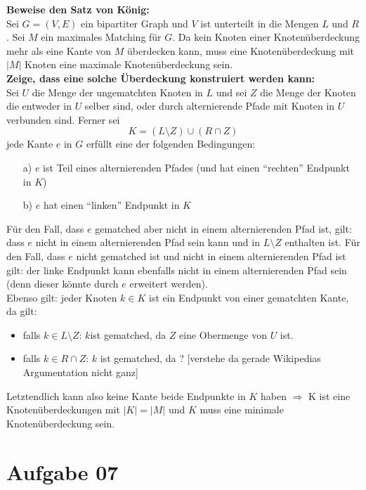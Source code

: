\documentclass[10pt,a4paper]{article}
\begin{document}
    \textbf{Beweise den Satz von König:} \\
    Sei $G = (V,E)$ ein bipartiter Graph und $V$ ist unterteilt in
    die Mengen $L$ und $R$. Sei $M$ ein maximales Matching für $G$.
    Da kein Knoten einer Knotenüberdeckung mehr als eine Kante von $M$
    überdecken kann, muss eine Knotenüberdeckung mit $|M|$ Knoten eine
    maximale Knotenüberdeckung sein.
    \\
    \textbf{Zeige, dass eine solche Überdeckung konstruiert werden kann:}
    \\
    Sei $U$ die Menge der ungematchten Knoten in $L$ und sei $Z$ die Menge
    der Knoten die entweder in $U$ selber sind, oder durch alternierende Pfade mit
    Knoten in $U$ verbunden sind. Ferner sei
    $$
        K = (L\setminus Z) \cup (R\cap Z)
    $$
    jede Kante $e$ in $G$ erfüllt eine der folgenden Bedingungen:
    \begin{itemize}
        \item[a)] $e$ ist Teil eines alternierenden Pfades (und hat einen ``rechten''
        Endpunkt in $K$)
        \item[b)] $e$ hat einen ``linken'' Endpunkt in $K$
    \end{itemize}
    Für den Fall, dass $e$ gematched aber nicht in einem alternierenden Pfad ist, gilt:
    dass $e$ nicht in einem alternierenden Pfad sein kann und in $L\setminus Z$
    enthalten ist. Für den Fall, dass $e$ nicht gematched ist und nicht in
    einem alternierenden Pfad ist gilt: der linke Endpunkt  kann ebenfalls nicht
    in einem alternierenden Pfad sein (denn dieser könnte durch $e$ erweitert werden).
   \\
   Ebenso gilt: jeder Knoten $k \in K$ ist ein Endpunkt von einer gematchten
   Kante, da gilt:
   \begin{itemize}
        \item  falls $k \in L\setminus Z $: $k $ist gematched, da $Z$ eine Obermenge von $U$ ist.
        \item falls $k \in R\cap Z$: $k$ ist gematched, da ? [verstehe da gerade Wikipedias Argumentation nicht ganz]

   \end{itemize}
    Letztendlich kann also keine Kante beide Endpunkte in $K$ haben
    $\Rightarrow$ K ist eine Knotenüberdeckungen mit $|K| = |M|$ und $K$ muss
    eine minimale Knotenüberdeckung sein.

\section*{Aufgabe 07}
\end{document}
